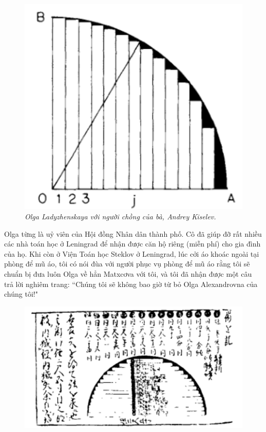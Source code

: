 \begin{multicols}{2}
	\begin{figure}[H]
		\vspace*{5pt}
		\centering
		\captionsetup{labelformat= empty, justification=centering}
		\includegraphics[width= 1\linewidth]{3}
		\caption{\small\textit{\color{lichsutoanhoc}Olga Ladyzhenskaya với người chồng của bà, Andrey Kiselev.}}
		\vspace*{-5pt}
	\end{figure}
	Olga từng là uỷ viên của Hội đồng Nhân dân thành phố. Cô đã giúp đỡ rất nhiều các nhà toán học ở Leningrad để nhận được căn hộ riêng (miễn phí) cho gia đình của họ. Khi còn ở Viện Toán học Steklov ở Leningrad, lúc cởi áo khoác ngoài  tại phòng để mũ áo, tôi có nói đùa với người phục vụ phòng để mũ áo rằng tôi sẽ chuẩn bị đưa luôn Olga  về hẳn Matxcơva với tôi, và tôi đã nhận được một  câu trả lời nghiêm trang: ``Chúng tôi sẽ không bao giờ từ bỏ Olga Alexandrovna của chúng tôi!"
	\begin{figure}[H]
		\vspace*{-5pt}
		\centering
		\captionsetup{labelformat= empty, justification=centering}
		\includegraphics[width= 0.9\linewidth]{2}

\end{figure}
\end{multicols}
